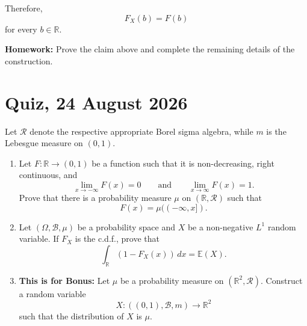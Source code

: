 Therefore,
\[
F_X(b)=F(b)
\]
for every $b\in\mathbb{R}$.

\textbf{Homework:} Prove the claim above and complete the remaining
details of the construction.
 



\lectureend


\section{Quiz, 24 August 2026}

Let $\mathcal{R}$ denote the respective appropriate Borel sigma algebra,
while $m$ is the Lebesgue measure on $(0,1)$.

\begin{quiz}

\begin{enumerate}

    \item Let $F:\mathbb{R}\to(0,1)$ be a function such that it is
    non-decreasing, right continuous, and
    \[
        \lim_{x\to-\infty}F(x)=0
        \qquad\text{and}\qquad
        \lim_{x\to\infty}F(x)=1.
    \]
    Prove that there is a probability measure $\mu$ on
    $(\mathbb{R},\mathcal{R})$ such that
    \[
        F(x)=\mu((-\infty,x]).
    \]

    \item Let $(\Omega,\mathcal{B},\mu)$ be a probability space and
    $X$ be a non-negative $L^1$ random variable. If $F_X$ is
    the c.d.f., prove that
    \[
        \int_{\mathbb{R}}(1-F_X(x))\,dx=\mathbb{E}(X).
    \]

    \item \textbf{This is for Bonus:} Let $\mu$ be a probability measure on
    $(\mathbb{R}^2,\mathcal{R})$. Construct a random variable
    \[
        X:((0,1),\mathcal{B},m)\to\mathbb{R}^2
    \]
    such that the distribution of $X$ is $\mu$.

\end{enumerate}

\end{quiz}
